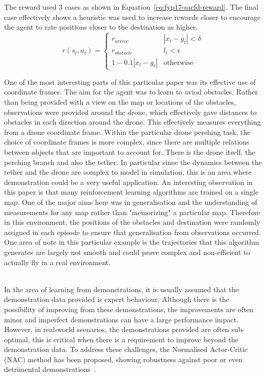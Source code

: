 The reward used 3 cases as shown in Equation~\ref{eq:fyp17-sacfd-reward}. 
The final case effectively shows a heuristic was used to increase rewards closer to encourage the agent to rate positions closer to the destination as higher.
\begin{equation}
  r(s_{t}, a_{t}) =
  \begin{cases} 
    r_{arrive} & |x_{t} - g_{t}| < \delta \\
    r_{obstacle} & l_{t} < \epsilon \\
    1-0.1 |x_{t} - g_{t}| & \text{otherwise}
  \end{cases}
  \label{eq:fyp17-sacfd-reward}
\end{equation}

One of the most interesting parts of this particular paper was its effective use of coordinate frames.
The aim for the agent was to learn to aviod obstacles.
Rather than being provided with a view on the map or locations of the obstacles, observations were provided around the drone, which effectively gave distances to obstacles in each direction around the drone.
This effectively measures everything from a drone coordinate frame.
Within the particular drone perching task, the choice of coordinate frames is more complex, since there are multiple relations between objects that are important to account for.
There is the drone itself, the perching branch and also the tether.
In particular since the dynamics between the tether and the drone are complex to model in simulation, this is an area where demonstration could be a very useful application.
An interesting observation in this paper is that many reinforcement learning algorithms are trained on a single map.
One of the major aims here was in generalisation and the understanding of measurements for any map rather than "memorizing" a particular map.
Therefore in this environment, the positions of the obstacles and destination were randomly assigned in each episode to ensure that generalisation from observations occurred.
One area of note in this particular example is the trajectories that this algorithm generates are largely not smooth and could prove complex and non-efficient to actually fly in a real environment. \\\\



In the area of learning from demonstrations, it is usually assumed that the demonstration data provided is expert behaviour.
Although there is the possibility of improving from these demonstrations, the improvements are often minor and imperfect demonstrations can have a large performance impact.
However, in real-world scenarios, the demonstrations provided are often sub-optimal, this is critical when there is a requirement to improve beyond the demonstration data.
To address these challenges, the Normalised Actor-Critic (NAC) method has been proposed, showing robustness against poor or even detrimental demonstrations~\cite{fyp14-rl-imperfect-demos}.

